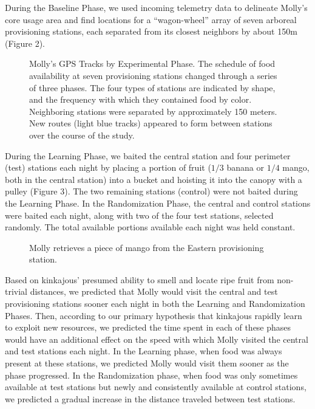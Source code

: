 \documentclass[twoside,12pt,final]{ucthesis-CA2012}
\begin{document}
\begin{ucmainmatter}
During the Baseline Phase, we used incoming telemetry data to delineate Molly's core usage area and find locations for a ``wagon-wheel'' array of seven arboreal provisioning stations, each separated from its closest neighbors by about 150m (Figure 2).
\begin{figure}[htbp]
\centering
\setlength{\fboxsep}{0pt}
\setlength{\fboxrule}{1pt}
\caption[Molly’s GPS tracks by experimental phase]{Molly’s GPS Tracks by Experimental Phase. The schedule of food availability at seven provisioning stations changed through a series of three phases. The four types of stations are indicated by shape, and the frequency with which they contained food by color. Neighboring stations were separated by approximately 150 meters. New routes (light blue tracks) appeared to form between stations over the course of the study.
\label{Figure 2. Molly’s GPS Tracks by Experimental Phase.}}
\end{figure}
During the Learning Phase, we baited the central station and four perimeter (test) stations each night by placing a portion of fruit (\(1/3\) banana or \(1/4\) mango, both in the central station) into a bucket and hoisting it into the canopy with a pulley (Figure 3). The two remaining stations (control) were not baited during the Learning Phase. In the Randomization Phase, the central and control stations were baited each night, along with two of the four test stations, selected randomly. The total available portions available each night was held constant.
\begin{figure}[htbp]
\centering
\setlength{\fboxsep}{0pt}
\setlength{\fboxrule}{1pt}
\caption{Molly retrieves a piece of mango from the Eastern provisioning station.
\label{Figure 3. Molly retrieves a piece of mango from the Eastern provisioning station.}}
\end{figure}
Based on kinkajous' presumed ability to smell and locate ripe fruit from non-trivial distances, we predicted that Molly would visit the central and test provisioning stations sooner each night in both the Learning and Randomization Phases. Then, according to our primary hypothesis that kinkajous rapidly learn to exploit new resources, we predicted the time spent in each of these phases would have an additional effect on the speed with which Molly visited the central and test stations each night. In the Learning phase, when food was always present at these stations, we predicted Molly would visit them sooner as the phase progressed. In the Randomization phase, when food was only sometimes available at test stations but newly and consistently available at control stations, we predicted a gradual increase in the distance traveled between test stations.


\end{ucmainmatter}
\end{document}
